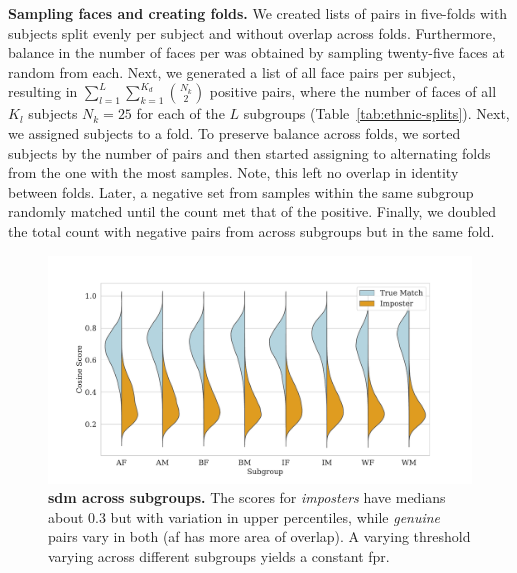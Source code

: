 


\vspace{1mm}
\noindent\textbf{Sampling faces and creating folds.} We created lists of pairs in five-folds with subjects split evenly per subject and without overlap across folds. Furthermore, balance in the number of faces per was obtained by sampling twenty-five faces at random from each. Next, we generated a list of all face pairs per subject, resulting in $\sum_{l=1}^{L}\sum_{k=1}^{K_d} {N_k \choose 2}$ positive pairs, where the number of faces of all $K_l$ subjects $N_k=25$  for each of the $L$ subgroups (Table~\ref{tab:ethnic-splits}). Next, we assigned subjects to a fold. To preserve balance across folds, we sorted subjects by the number of pairs and then started assigning to alternating folds from the one with the most samples. Note, this left no overlap in identity between folds. Later, a negative set from samples within the same subgroup randomly matched until the count met that of the positive. Finally, we doubled the total count with negative pairs from across subgroups but in the same fold.
\begin{figure}[t!] 
	\centering
	\centering
	\includegraphics[trim=0.3in 0.1in 0.2in 0.2in,clip,angle=-0,origin=c,width=1\linewidth]{images/violinplots.pdf}
		\caption{\textbf{\Gls{sdm} across subgroups.} The scores for \emph{imposters} have medians about 0.3 but with variation in upper percentiles, while \emph{genuine} pairs vary in both (\eg \gls{af} has more area of overlap). A varying threshold varying across different subgroups yields a constant \gls{fpr}.} \label{fig:detection-model} 
\end{figure} 


\vspace{-5pt}
